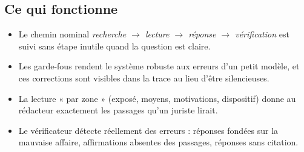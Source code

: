 \documentclass[11pt,a4paper]{article}
\begin{document}
\subsection{Ce qui fonctionne}
\begin{itemize}
  \item Le chemin nominal \emph{recherche $\rightarrow$ lecture $\rightarrow$ réponse $\rightarrow$ vérification} est suivi sans étape inutile quand la question est claire.
  \item Les garde-fous rendent le système robuste aux erreurs d'un petit modèle, et ces corrections sont visibles dans la trace au lieu d'être silencieuses.
  \item La lecture « par zone » (exposé, moyens, motivations, dispositif) donne au rédacteur exactement les passages qu'un juriste lirait.
  \item Le vérificateur détecte réellement des erreurs : réponses fondées sur la mauvaise affaire, affirmations absentes des passages, réponses sans citation.
\end{itemize}
\end{document}
